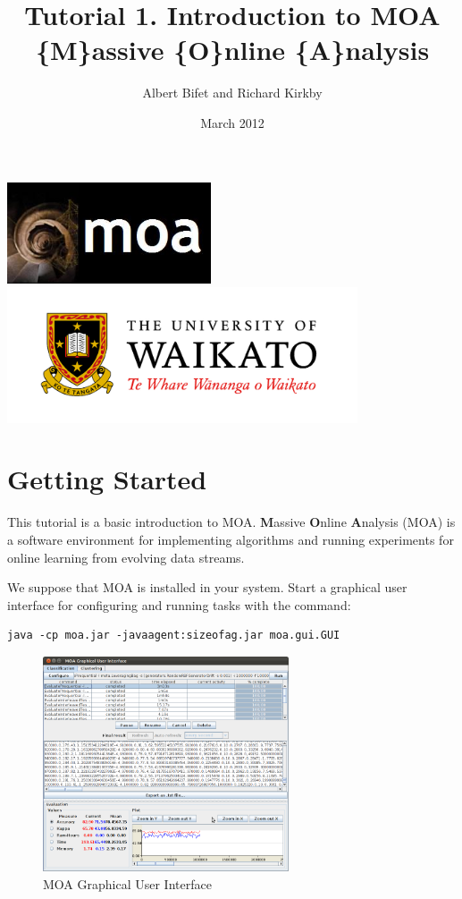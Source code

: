 \documentclass[a4paper,12pt]{article}
\title{Tutorial 1. Introduction to MOA \\ \{M\}assive \{O\}nline \{A\}nalysis}
\author{Albert Bifet and Richard Kirkby}
\date{March 2012}
\begin{document}
\lstset{language=Java,basicstyle=\tiny,numbers=left}
\maketitle
\begin{center}
\includegraphics[height=3cm]{figures/LogoMOA.jpg} \\
\includegraphics[height=4cm]{figures/Waikato.jpg} \\ 
\end{center}
\thispagestyle{empty}
\newpage
\setcounter{page}{1}

\section{Getting Started}

This tutorial is a basic introduction to MOA.
{\bf M}assive {\bf O}nline {\bf A}nalysis (MOA) is a  
software environment for implementing algorithms and running experiments
for online learning from 
evolving data streams.

We suppose that MOA is installed in your system.
Start a graphical user interface for configuring and running tasks with the command:

\begin{verbatim}
java -cp moa.jar -javaagent:sizeofag.jar moa.gui.GUI
\end{verbatim}

\begin{figure}[h]
\begin{center} 
\includegraphics[height=2.5in]{figures/MOA_Task.png}
\end{center} 
\caption{MOA Graphical User Interface}
\label{fig:moagui}
\end{figure}
\end{document}
